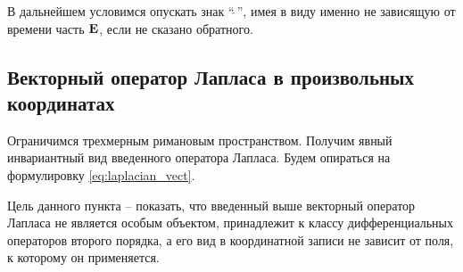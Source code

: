 \documentclass[12pt,a4paper]{article}
\begin{document}
        В дальнейшем условимся опускать знак \enquote{$\hat{\ }$}, имея в виду именно не зависящую от времени часть $\mathbf{E}$, если не сказано обратного.


    \subsection{Векторный оператор Лапласа в произвольных координатах}

        Ограничимся трехмерным римановым пространством. Получим явный инвариантный вид введенного оператора Лапласа. Будем опираться на формулировку \autoref{eq:laplacian_vect}.

        Цель данного пункта -- показать, что введенный выше векторный оператор Лапласа не является особым объектом, принадлежит к классу дифференциальных операторов второго порядка, а его вид в координатной записи не зависит от поля, к которому он применяется.
\end{document}
